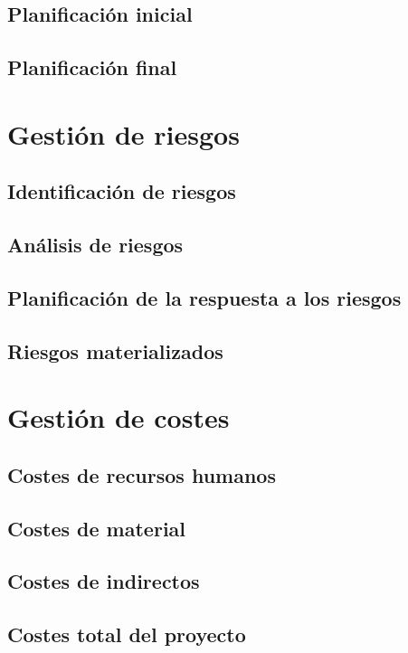 \subsection{Planificación inicial}
\subsection{Planificación final}


\section{Gestión de riesgos}
\subsection{Identificación de riesgos}
\subsection{Análisis de riesgos}
\subsection{Planificación de la respuesta a los riesgos}
\subsection{Riesgos materializados}

\section{Gestión de costes}
\subsection{Costes de recursos humanos}
\subsection{Costes de material}
\subsection{Costes de indirectos}
\subsection{Costes total del proyecto}